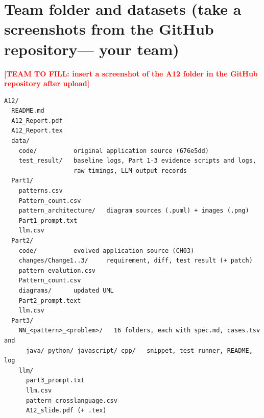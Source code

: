 \documentclass[11pt,a4paper]{article}
\newcommand{\todo}[1]{\textcolor{red}{\textbf{[TEAM TO FILL: #1]}}}
\begin{document}
\section{Team folder and datasets (take a screenshots from the GitHub repository--- your team)}
\todo{insert a screenshot of the A12 folder in the GitHub repository after upload}
\begin{verbatim}
A12/
  README.md
  A12_Report.pdf
  A12_Report.tex
  data/
    code/          original application source (676e5dd)
    test_result/   baseline logs, Part 1-3 evidence scripts and logs,
                   raw timings, LLM output records
  Part1/
    patterns.csv
    Pattern_count.csv
    pattern_architecture/   diagram sources (.puml) + images (.png)
    Part1_prompt.txt
    llm.csv
  Part2/
    code/          evolved application source (CH03)
    changes/Change1..3/     requirement, diff, test result (+ patch)
    pattern_evalution.csv
    Pattern_count.csv
    diagrams/      updated UML
    Part2_prompt.text
    llm.csv
  Part3/
    NN_<pattern>_<problem>/   16 folders, each with spec.md, cases.tsv and
      java/ python/ javascript/ cpp/   snippet, test runner, README, log
    llm/
      part3_prompt.txt
      llm.csv
      pattern_crosslanguage.csv
      A12_slide.pdf (+ .tex)
\end{verbatim}
\end{document}
